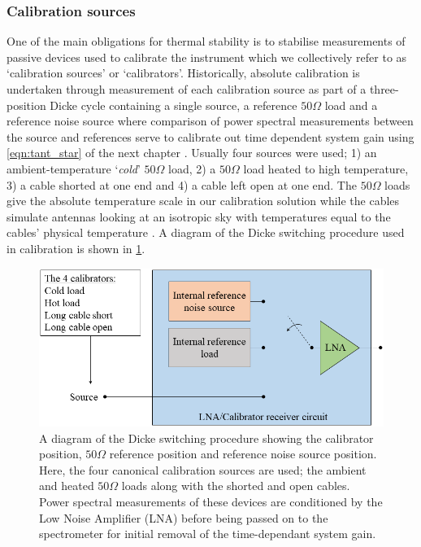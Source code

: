 \subsubsection{Calibration sources}
One of the main obligations for thermal stability is to stabilise measurements of passive devices used to calibrate the instrument which we collectively refer to as ‘calibration sources’ or ‘calibrators’. Historically, absolute calibration is undertaken through measurement of each calibration source as part of a three-position Dicke cycle containing a single source, a reference $50 \Omega$ load and a reference noise source where comparison of power spectral measurements between the source and references serve to calibrate out time dependent system gain using \cref{eqn:tant_star} of the next chapter \citep{edgesCal,rogersCal}. Usually four sources were used; 1) an ambient-temperature ‘\textit{cold}’ $50 \Omega$ load, 2) a $50 \Omega$ load heated to high temperature, 3) a cable shorted at one end and 4) a cable left open at one end. The $50 \Omega$ loads give the absolute temperature scale in our calibration solution while the cables simulate antennas looking at an isotropic sky with temperatures equal to the cables’ physical temperature \citep{rogersCal}. A diagram of the Dicke switching procedure used in calibration is shown in \cref{fig:dicke}.
\begin{figure}
    \centering
    \includegraphics[scale=0.5]{dicke}
    \caption{A diagram of the Dicke switching procedure showing the calibrator position, $50 \Omega$ reference position and reference noise source position. Here, the four canonical calibration sources are used; the ambient and heated $50 \Omega$ loads along with the shorted and open cables. Power spectral measurements of these devices are conditioned by the Low Noise Amplifier (LNA) before being passed on to the spectrometer for initial removal of the time-dependant system gain.}
    \label{fig:dicke}
\end{figure}

